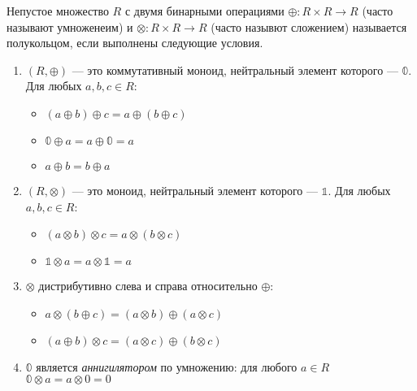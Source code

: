 \begin{definition}[Полукольцо]

Непустое множество $R$ с двумя бинарными операциями $\oplus\colon R \times R \to R$ (часто называют умноженеим) и $\otimes \colon R \times R \to R$ (часто назывют сложением) называется полукольцом, если выполнены следующие условия.
\begin{enumerate}

\item $(R, \oplus)$ --- это коммутативный моноид, нейтральный элемент которого --- $\mathbb{0}$. Для любых $a,b,c \in R$:
\begin{itemize}
	\item $(a \oplus b) \oplus c = a \oplus (b \oplus c)$
	\item $\mathbb{0} \oplus a = a \oplus \mathbb{0} = a$
	\item $a \oplus b = b \oplus a$
\end{itemize}

\item $(R, \otimes)$ --- это моноид, нейтральный элемент которого --- $\mathbb{1}$. Для любых $a,b,c \in R$:
\begin{itemize}
	\item $(a \otimes b) \otimes c = a \otimes (b \otimes c)$
    \item $\mathbb{1} \otimes a = a \otimes \mathbb{1} = a$
\end{itemize}

\item $\otimes$ дистрибутивно слева и справа относительно $\oplus$:
\begin{itemize}
	\item $a \otimes (b \oplus c) = (a \otimes b) \oplus (a \otimes c)$
    \item $(a \oplus b) \otimes c = (a \otimes c) \oplus (b \otimes c)$
\end{itemize}


\item $\mathbb{0}$ является \textit{аннигилятором} по умножению: для любого $a \in R$ 
$\mathbb{0} \otimes a = a \otimes 0 = 0$

\end{enumerate}

\end{definition}

